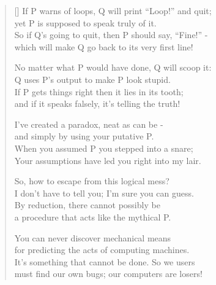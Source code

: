 \begin{verse}[\versewidth]
  If P warns of loops, Q will print “Loop!” and quit;\\
  yet P is supposed to speak truly of it.\\
  So if Q's going to quit, then P should say, “Fine!” -\\
  which will make Q go back to its very first line!

  No matter what P would have done, Q will scoop it:\\
  Q uses P's output to make P look stupid.\\
  If P gets things right then it lies in its tooth;\\
  and if it speaks falsely, it's telling the truth!

  I've created a paradox, neat as can be -\\
  and simply by using your putative P.\\
  When you assumed P you stepped into a snare;\\
  Your assumptions have led you right into my lair.

  So, how to escape from this logical mess?\\
  I don't have to tell you; I'm sure you can guess.\\
  By reduction, there cannot possibly be\\
  a procedure that acts like the mythical P.

  You can never discover mechanical means\\
  for predicting the acts of computing machines.\\
  It's something that cannot be done. So we users\\
  must find our own bugs; our computers are losers!
\end{verse}

